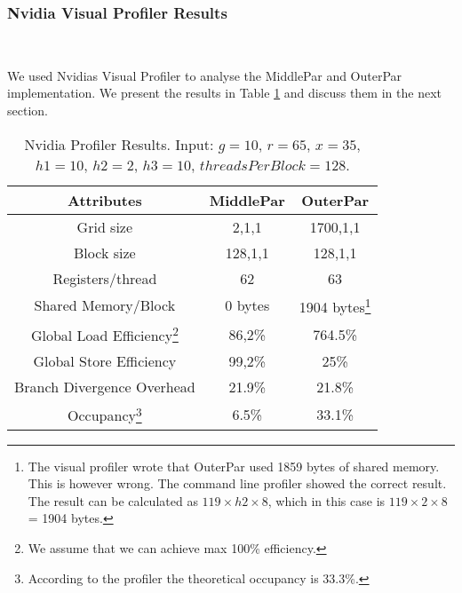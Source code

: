 \subsubsection{Nvidia Visual Profiler Results} \hfill \\
\label{sec:profiler}

We used Nvidias Visual Profiler to analyse the MiddlePar and OuterPar implementation. We present the results in Table \ref{table:profiler} and discuss them in the next section.
\begin{savenotes}
\begin{table}  
\begin{center}
\begin{tabular}[t]{|c|c|c|}
	\hline
\textbf{Attributes} & \textbf{MiddlePar} & \textbf{OuterPar} \\\hline
Grid size  & 2,1,1 & 1700,1,1\\\hline
Block size & 128,1,1&128,1,1\\\hline
Registers/thread & 62&63\\\hline
Shared Memory/Block &0 bytes& 1904 bytes\footnote{The visual profiler wrote that OuterPar used 1859 bytes of shared memory. This is however wrong. The command line profiler showed the correct result. The result can be calculated as $119 \times h2 \times 8$, which in this case is $119 \times 2 \times8$ = 1904 bytes.}\\\hline
Global Load Efficiency\footnote{We assume that we can achieve max 100\% efficiency.}&86,2\%&764.5\%\\\hline
Global Store Efficiency&99,2\%&25\%\\\hline
Branch Divergence Overhead&21.9\%& 21.8\%\\\hline
Occupancy\footnote{According to the profiler the theoretical occupancy is 33.3\%.}&6.5\%&33.1\%\\\hline
\end{tabular}
\end{center}
\caption{Nvidia Profiler Results. Input: $g=10$, $r=65$, $x=35$, $h1=10$, $h2=2$, $h3=10$, $threadsPerBlock=128$.}
\label{table:profiler}
\end{table}
\end{savenotes}

